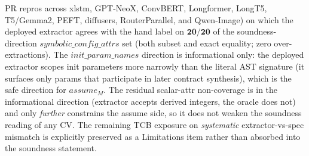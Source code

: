 PR repros across xlstm, GPT-NeoX, ConvBERT, Longformer,
LongT5, T5/Gemma2, PEFT, diffusers, RouterParallel, and Qwen-Image)
on which the deployed extractor agrees with the hand label on
$\mathbf{20/20}$ of the soundness-direction
$\mathit{symbolic\_config\_attrs}$ set (both subset and exact
equality; zero over-extractions). The
$\mathit{init\_param\_names}$ direction is informational only: the
deployed extractor scopes init parameters more narrowly than the
literal AST signature (it surfaces only params that participate in
later contract synthesis), which is the safe direction for
$\mathit{assume}_M$. The residual scalar-attr non-coverage is in
the informational direction (extractor accepts derived integers,
the oracle does not) and only \emph{further} constrains the
assume side, so it does not weaken the soundness reading of any
\textsc{CV}. The remaining TCB exposure on \emph{systematic}
extractor-vs-spec mismatch is explicitly preserved as a
Limitations item rather than absorbed into the soundness statement.

